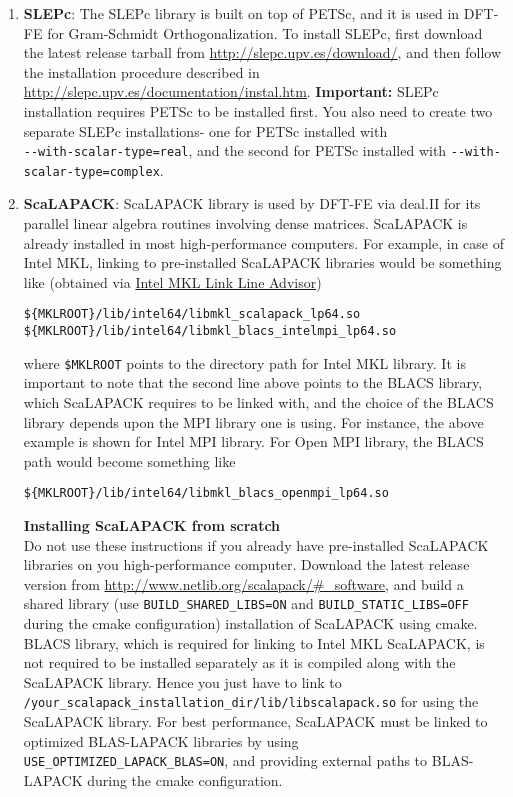 \begin{enumerate}
\item {\bf SLEPc}: The SLEPc library is built on top of PETSc, and it is used in DFT-FE for Gram-Schmidt Orthogonalization. To install SLEPc, first download the latest release tarball from \url{http://slepc.upv.es/download/}, and then follow the installation procedure described in \url{http://slepc.upv.es/documentation/instal.htm}. {\bf Important: } SLEPc installation requires PETSc to be installed first. You also need to create two separate SLEPc installations- one for PETSc installed with \\\verb|--with-scalar-type=real|, and the second for PETSc installed with \verb|--with-scalar-type=complex|.

\item {\bf ScaLAPACK}: ScaLAPACK library is used by DFT-FE via deal.II for its parallel linear algebra routines involving dense matrices. ScaLAPACK is already installed in most high-performance computers. For example, in case of Intel MKL, linking to pre-installed ScaLAPACK libraries would be something like (obtained via \href{https://software.intel.com/en-us/articles/intel-mkl-link-line-advisor}{Intel MKL Link Line Advisor})
\begin{verbatim}
${MKLROOT}/lib/intel64/libmkl_scalapack_lp64.so
${MKLROOT}/lib/intel64/libmkl_blacs_intelmpi_lp64.so
\end{verbatim}
where \verb|$MKLROOT| points to the directory path for Intel MKL library. It is important to note that the second line above points to the BLACS library, which ScaLAPACK requires to be linked with, and the choice of the BLACS library depends upon the MPI library one is using. For instance, the above example is shown for Intel MPI library. For Open MPI library, the BLACS path would become something like
\begin{verbatim}
${MKLROOT}/lib/intel64/libmkl_blacs_openmpi_lp64.so
\end{verbatim}

{\bf Installing ScaLAPACK from scratch}\\
Do not use these instructions if you already have pre-installed ScaLAPACK libraries on you high-performance computer.
Download the latest release version from \url{http://www.netlib.org/scalapack/#\_software}, and build a shared library (use \verb|BUILD_SHARED_LIBS=ON| and \verb|BUILD_STATIC_LIBS=OFF|  during the cmake configuration) installation of ScaLAPACK using cmake. BLACS library, which is required for linking to Intel MKL ScaLAPACK, is not required to be installed separately as it is compiled along with the ScaLAPACK library. Hence you just have to link to\\ \verb|/your_scalapack_installation_dir/lib/libscalapack.so| for using the ScaLAPACK library. For best performance, ScaLAPACK must be linked to optimized BLAS-LAPACK libraries by using\\ \verb|USE_OPTIMIZED_LAPACK_BLAS=ON|, and providing external paths to BLAS-LAPACK during the cmake configuration.   	
\end{enumerate}

